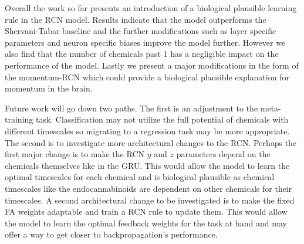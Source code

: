 \documentclass[a4paper, 11pt, oneside]{report}
\begin{document}
Overall the work so far presents an introduction of a biological plausible learning rule in the RCN model.
Results indicate that the model outperforms the Shervani-Tabar baseline and the further modifications
such as layer specific parameters and neuron specific biases improve the model further. However
we also find that the number of chemicals past 1 has a negligible impact on the performance of the model.
Lastly we present a major modifications in the form of the momentum-RCN which could provide a biological
plausible explanation for momentum in the brain.

Future work will go down two paths. The first is an adjustment to the meta-training task.
Classification may not utilize the full potential of chemicals with different timescales so 
migrating to a regression task may be more appropriate. The second is to investigate more architectural 
changes to the RCN. Perhaps the first major change is to make the RCN $y$ and $z$ parameters depend on the chemicals
themselves like in the GRU. This would allow the model to learn the optimal timescales for each chemical and
is biological plausible as chemical timescales like the endocannabinoids are dependent on other chemicals for their
timescales. A second architectural change to be investigated is to make the fixed FA weights adaptable and train
a RCN rule to update them. This would allow the model to learn the optimal feedback weights for the task at hand
and may offer a way to get closer to backpropagation's performance.

%
%
{
\renewcommand{\clearpage}{} %
\AtNextBibliography{\small}
\printbibliography
\thispagestyle{lastpage}
}
\end{document}
